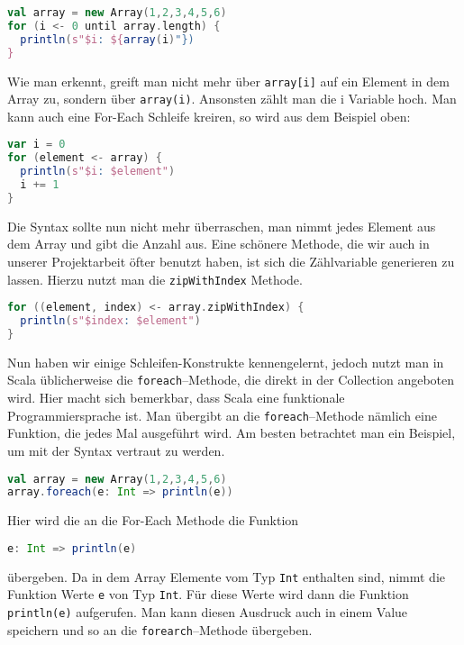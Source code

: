 \begin{lstlisting}[language=Scala]
val array = new Array(1,2,3,4,5,6)
for (i <- 0 until array.length) {
  println(s"$i: ${array(i)"})
}
\end{lstlisting}

Wie man erkennt, greift man nicht mehr über \texttt{array[i]} auf ein Element in dem Array zu, sondern über \texttt{array(i)}. Ansonsten zählt man die i Variable hoch. Man kann auch eine For-Each Schleife kreiren, so wird aus dem Beispiel oben:

\begin{lstlisting}[language=Scala,caption=For--Each in Scala]
var i = 0
for (element <- array) {
  println(s"$i: $element")
  i += 1
}
\end{lstlisting}

Die Syntax sollte nun nicht mehr überraschen, man nimmt jedes Element aus dem Array und gibt die Anzahl aus. Eine schönere Methode, die wir auch in unserer Projektarbeit öfter benutzt haben, ist sich die Zählvariable generieren zu lassen. Hierzu nutzt man die \texttt{zipWithIndex} Methode.

\begin{lstlisting}[language=Scala]
for ((element, index) <- array.zipWithIndex) {
  println(s"$index: $element")
}
\end{lstlisting}

Nun haben wir einige Schleifen-Konstrukte kennengelernt, jedoch nutzt man in Scala üblicherweise die \texttt{foreach}--Methode, die direkt in der Collection angeboten wird. Hier macht sich bemerkbar, dass Scala eine funktionale Programmiersprache ist. Man übergibt an die \texttt{foreach}--Methode nämlich eine Funktion, die jedes Mal ausgeführt wird. Am besten betrachtet man ein Beispiel, um mit der Syntax vertraut zu werden.

\begin{lstlisting}[language=Scala]
val array = new Array(1,2,3,4,5,6)
array.foreach(e: Int => println(e))
\end{lstlisting}

Hier wird die an die For-Each Methode die Funktion

\begin{lstlisting}[language=Scala,numbers=none]
e: Int => println(e)
\end{lstlisting}

übergeben. Da in dem Array Elemente vom Typ \texttt{Int} enthalten sind, nimmt die Funktion Werte \texttt{e} von Typ \texttt{Int}. Für diese Werte wird dann die Funktion \texttt{println(e)} aufgerufen. Man kann diesen Ausdruck auch in einem Value speichern und so an die \texttt{forearch}--Methode übergeben.


